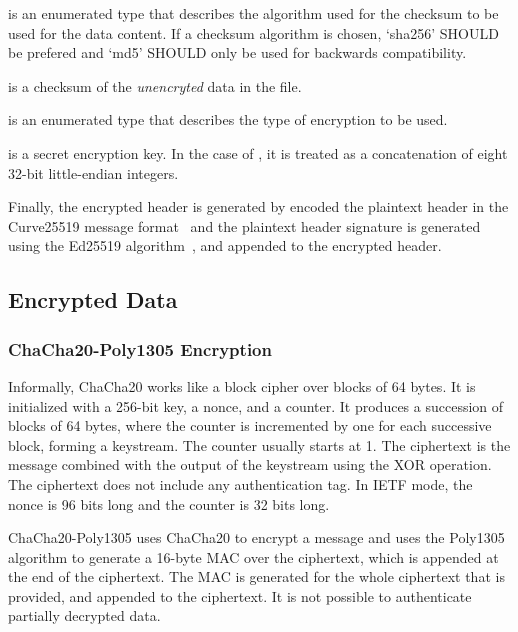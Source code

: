  is an enumerated type that describes the algorithm
used for the checksum to be used for the data content. If a checksum
algorithm is chosen, `sha256' SHOULD be prefered and `md5' SHOULD only
be used for backwards compatibility.

 is a checksum of the \emph{unencryted} data in the file.

 is an enumerated type that describes the type of encryption to be used.

 is a secret encryption key.
%
In the case of , it is treated as a
concatenation of eight 32-bit little-endian integers.

Finally, the encrypted header is generated by encoded the plaintext
header in the Curve25519 message format~\cite{RFC7748} and
%
the plaintext header signature is generated using the Ed25519
algorithm~\cite{RFC8032}, and appended to the encrypted header.

\subsection{Encrypted Data}
\subsubsection{ChaCha20-Poly1305 Encryption}

Informally, ChaCha20 works like a block cipher over blocks of 64 bytes.
%
It is initialized with a 256-bit key, a nonce, and a counter.
%
It produces a succession of blocks of 64 bytes, where the counter is
incremented by one for each successive block, forming a keystream.
%
The counter usually starts at 1.
%
The ciphertext is the message combined with the output of the
keystream using the XOR operation.
%
The ciphertext does not include any authentication tag.
%
In IETF mode, the nonce is 96 bits long and the counter is 32 bits
long.

ChaCha20-Poly1305 uses ChaCha20 to encrypt a message and uses the
Poly1305 algorithm to generate a 16-byte MAC over the ciphertext,
which is appended at the end of the ciphertext.
%
The MAC is generated for the whole ciphertext that is provided, and
appended to the ciphertext.
%
It is not possible to authenticate partially decrypted data.

